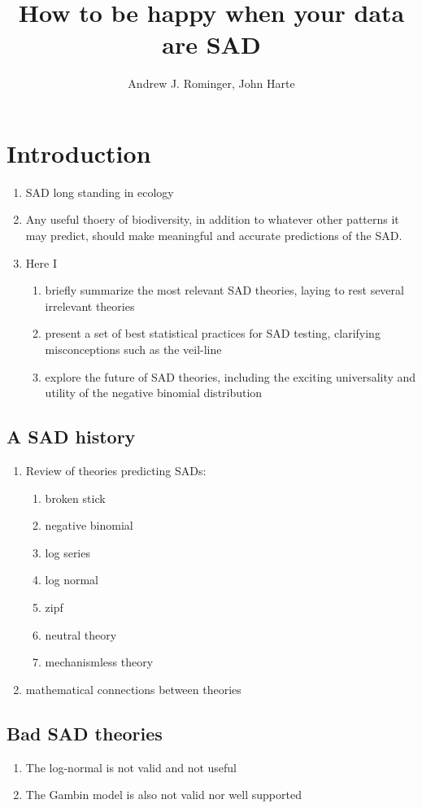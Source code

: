 \documentclass[12pt]{article}
\title{How to be happy when your data are SAD}
\author{Andrew J. Rominger, John Harte}
\begin{document}
\maketitle

\section{Introduction}

\begin{enumerate}
\item SAD long standing in ecology
\item Any useful thoery of biodiversity, in addition to whatever other patterns it may predict, should make
meaningful and accurate predictions of the SAD. 
\item Here I
\begin{enumerate}
\item briefly summarize the most relevant SAD theories, laying to rest
several irrelevant theories
\item present a set of best statistical practices for SAD testing,
clarifying misconceptions such as the veil-line
\item explore the future of SAD theories, including the exciting
universality and utility of the negative binomial distribution
\end{enumerate}
\end{enumerate}


\subsection{A SAD history}
\begin{enumerate}
\item Review of theories predicting SADs: 
  \begin{enumerate}
  \item broken stick
  \item negative binomial
  \item log series
  \item log normal
  \item zipf
  \item neutral theory
  \item mechanismless theory
  \end{enumerate}
\item mathematical connections between theories
\end{enumerate}

\subsection{Bad SAD theories}
\begin{enumerate}
\item The log-normal is not valid and not useful
\item The Gambin model is also not valid nor well supported
\end{enumerate}
\end{document}
